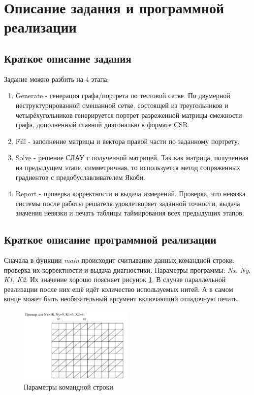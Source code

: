 \section{Описание задания и программной реализации}
	\subsection{Краткое описание задания}
		Задание можно разбить на 4 этапа:
		\begin{enumerate}
			\item Generate - генерация графа/портрета по тестовой сетке. По двумерной неструктурированной смешанной сетке, состоящей из треугольников и четырёхугольников генерируется портрет разреженной матрицы смежности графа, дополненный главной диагональю в формате CSR.
			\item Fill - заполнение матрицы и вектора правой части по заданному портрету.
			\item Solve - решение СЛАУ с полученной матрицей. Так как матрица, полученная на предыдущем этапе, симметричная, то используется метод сопряженных градиентов с предобуславливателем Якоби.
			\item Report - проверка корректности и выдача измерений. Проверка, что невязка системы после работы решателя удовлетворяет заданной точности, выдача значения невязки и печать таблицы таймирования всех предыдущих этапов.

		\end{enumerate}

	\subsection{Краткое описание программной реализации}
		Сначала в функции \textit{main} происходит считывание данных командной строки, проверка их корректности и выдача диагностики. Параметры программы: \textit{Nx}, \textit{Ny}, \textit{K1}, \textit{K2}. Их значение хорошо поясняет рисунок \ref{param}. В случае параллельной реализации после них ещё идёт количество используемых нитей. А в самом конце может быть необязательный аргумент включающий отладочную печать.
			\begin{figure}[H]
		        \centering
		        \includegraphics[width=0.5\textwidth]{./images/param}
		        \caption{Параметры командной строки}
		        \label{param}
		    \end{figure}


